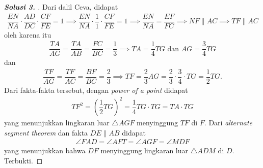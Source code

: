 \documentclass[letterpaper, 13pt]{scrartcl}
\begin{document}
\begin{proof}[\textbf{Solusi 3. }]
    Dari dalil Ceva, didapat
    \begin{align*}
        \dfrac{EN}{NA} \cdot \dfrac{AD}{DC} \cdot \dfrac{CF}{FE} = 1 \implies \dfrac{EN}{NA} \cdot \dfrac{1}{1} \cdot \dfrac{CF}{FE} = 1 \implies \dfrac{EN}{NA} = \dfrac{EF}{FC} \implies NF \parallel AC \implies TF \parallel AC
    \end{align*}
    oleh karena itu
    \begin{align*}
        \dfrac{TA}{AG}=\dfrac{TA}{AB} = \dfrac{FC}{BC} = \dfrac{1}{3} \implies TA = \dfrac{1}{4} TG \text{ dan } AG = \dfrac{3}{4}TG
    \end{align*}
    dan
    \begin{align*}
        \dfrac{TF}{AG}=\dfrac{TF}{AC} = \dfrac{BF}{BC} = \dfrac{2}{3} \implies TF= \dfrac{2}{3}AG = \dfrac{2}{3} \cdot \dfrac{3}{4} \cdot TG = \dfrac{1}{2} TG.
    \end{align*}
    Dari fakta-fakta tersebut, dengan \textit{power of a point} didapat
    \begin{align*}
        TF^2 = \left(\dfrac{1}{2} TG\right)^2 = \dfrac{1}{4}TG \cdot TG = TA \cdot TG
    \end{align*}
    yang menunjukkan lingkaran luar $\triangle AGF$ menyinggung $TF$ di $F$. Dari \textit{alternate segment theorem} dan fakta $DE \parallel AB$ didapat
    \begin{align*}
        \angle FAD = \angle AFT = \angle AGF = \angle MDF
    \end{align*}
    yang menunjukkan bahwa $DF$ menyinggung lingkaran luar $\triangle ADM$ di $D$. Terbukti.
\end{proof}
\end{document}
